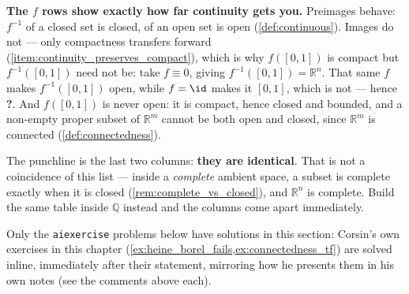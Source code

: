 \begin{exercisesolution}
\textbf{The $f$ rows show exactly how far continuity gets you.} Preimages behave: $f^{-1}$ of a
closed set is closed, of an open set is open (\cref{def:continuous}). Images do not --- only
compactness transfers forward (\cref{item:continuity_preserves_compact}), which is why
$f([0,1])$ is compact but $f^{-1}([0,1])$ need not be: take $f \equiv 0$, giving
$f^{-1}([0,1]) = \mathbb{R}^n$. That same $f$ makes $f^{-1}([0,1])$ open, while $f = \id$ makes
it $[0,1]$, which is not --- hence \textbf{?}. And $f([0,1])$ is never open: it is compact,
hence closed and bounded, and a non-empty proper subset of $\mathbb{R}^m$ cannot be both open
and closed, since $\mathbb{R}^m$ is connected (\cref{def:connectedness}).

\begin{ainote}
The punchline is the last two columns: \textbf{they are identical}. That is not a coincidence of
this list --- inside a \emph{complete} ambient space, a subset is complete exactly when it is
closed (\cref{rem:complete_vs_closed}), and $\mathbb{R}^n$ is complete. Build the same table
inside $\mathbb{Q}$ instead and the columns come apart immediately.
\end{ainote}
\end{exercisesolution}

\begin{ainote}
Only the \texttt{aiexercise} problems below have solutions in this section: Corsin's own
exercises in this chapter (\cref{ex:heine_borel_fails,ex:connectedness_tf}) are solved inline,
immediately after their statement, mirroring how he presents them in his own notes (see the
 comments above each).
\end{ainote}

